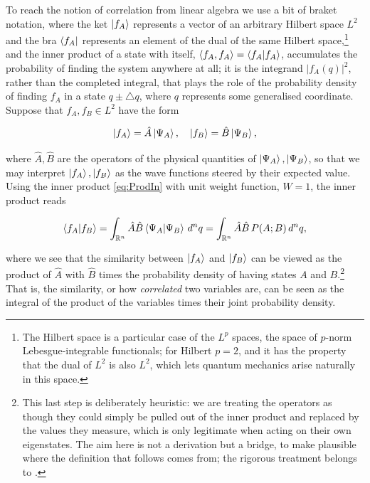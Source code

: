 	To reach the notion of correlation from linear algebra we use a bit of braket notation,
	where the ket $\ket{f_A}$ represents a vector of an arbitrary Hilbert space $L^2$ and the
	bra $\bra{f_A}$ represents an element of the dual of the same Hilbert space,\footnote{The
	Hilbert space is a particular case of the $L^p$ spaces, the space of $p$-norm
	Lebesgue-integrable functionals; for Hilbert $p=2$, and it has the property that the dual
	of $L^2$ is also $L^2$, which lets quantum mechanics arise naturally in this space.} and
	the inner product of a state with itself, $\braket{f_A,f_A}= \braket{f_A|f_A}$, accumulates
	the probability of finding the system anywhere at all; it is the integrand $|f_A(q)|^2$,
	rather than the completed integral, that plays the role of the probability density of
	finding $f_A$ in a state $q \pm \triangle q$, where $q$ represents some
	generalised coordinate. Suppose that $f_A,f_B \in L^2$ have the form

	\begin{equation}
		\ket{f_A} = \hat{A}\ket{\Psi_A}, \quad \ket{f_B} = \hat{B}\ket{\Psi_B},
	\end{equation}

	where $\hat{A},\hat{B}$ are the operators of the physical quantities of
	$\ket{\Psi_A},\ket{\Psi_B}$, so that we may interpret $\ket{f_A},\ket{f_B}$ as the wave
	functions steered by their expected value. Using the inner product \eqref{eq:ProdIn} with
	unit weight function, $W=1$, the inner product reads

	\begin{equation}
		\braket{f_A | f_B} = \int_{\mathbb{R}^n} \hat{A}\hat{B} \braket{\Psi_A|\Psi_B}\, d^nq = \int_{\mathbb{R}^n} \hat{A}\hat{B}\, P(A;B)\, d^nq,
	\end{equation}

	where we see that the similarity between $\ket{f_A}$ and $\ket{f_B}$ can be viewed as the
	product of $\hat{A}$ with $\hat{B}$ times the probability density of having states $A$ and
	$B$.\footnote{This last step is deliberately heuristic: we are treating the operators as
	though they could simply be pulled out of the inner product and replaced by the values they
	measure, which is only legitimate when acting on their own eigenstates. The aim here is not
	a derivation but a bridge, to make plausible where the definition that follows comes from;
	the rigorous treatment belongs to \cite{mandel1995optical}.} That is, the similarity, or how
	\textit{correlated} two variables are, can be seen as
	the integral of the product of the variables times their joint probability density.

